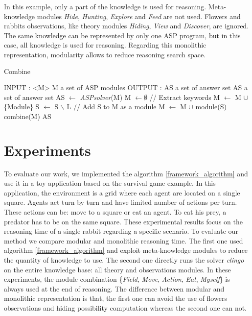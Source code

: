 \documentclass{aamas2012}
\begin{document}
	In this example, only a part of the knowledge is used for reasoning.
	Meta-knowledge modules \emph{Hide}, \emph{Hunting}, \emph{Explore} and \emph{Feed} are not used.
	Flowers and rabbits observations, like theory modules \emph{Hiding}, \emph{View} and \emph{Discover}, are ignored.
	The same knowledge can be represented by only one ASP program, but in this case, all knowledge is used for reasoning.
	Regarding this monolithic representation, modularity allows to reduce reasoning search space.

	\begin{algorithm}
	\caption{Combine}
	\label{framework_algorithm}
	\begin{algorithmic}[1]
	\STATE INPUT : <M> M a set of ASP modules
	\STATE OUTPUT : AS a set of answer set
	\newline
	\STATE AS a set of answer set
	\newline
	\STATE AS $\leftarrow$ \emph{ASPsolver}(M)
	\newline
		\STATE M $\leftarrow \emptyset$ 
		\newline
		\STATE // Extract keywords
				\STATE M $\leftarrow$ M $\cup$ \{Module\}
				\STATE S $\leftarrow$ S $\backslash$ L
			\ENDIF
		\ENDFOR
		\newline
			\STATE // Add S to M as a module
			\STATE M $\leftarrow$ M $\cup$ module(S)
			\RETURN combine(M)
		\ENDIF
	\ENDFOR
	\newline
	\RETURN AS
	\end{algorithmic}
	\end{algorithm}

\section{Experiments}

	To evaluate our work, we implemented the algorithm \ref{framework_algorithm} and use it in a toy application based on the survival game example.
	In this application, the environment is a grid where each agent are located on a single square.
	Agents act turn by turn and have limited number of actions per turn.
	These actions can be: move to a square or eat an agent.
	To eat his prey, a predator has to be on the same square.
	These experimental results focus on the reasoning time of a single rabbit regarding a specific scenario.
	To evaluate our method we compare modular and monolithic reasoning time.
	The first one used algorithm \ref{framework_algorithm} and exploit meta-knowledge modules to reduce the quantity of knowledge to use.
	The second one directly runs the solver \emph{clingo} on the entire knowledge base: all theory and observations modules.
	In these experiments, the module combination \{\emph{Field}, \emph{Move}, \emph{Action}, \emph{Eat}, \emph{Myself}\} is always used at the end of reasoning.
	The difference between modular and monolithic representation is that,
	the first one can avoid the use of flowers observations and hiding possibility computation whereas the second one can not.
	
\end{document}
